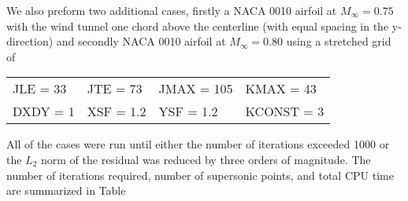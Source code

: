 We also preform two additional cases, firstly a NACA 0010 airfoil at $M_\infty = 0.75$ with the wind tunnel one chord above the centerline (with equal spacing in the y-direction) and secondly NACA 0010 airfoil at $M_\infty = 0.80$ using a stretched grid of

\begin{center}
    \begin{tabular}{@{} l l l l @{}}
        JLE = 33  & JTE = 73  & JMAX = 105  & KMAX = 43 \\
        DXDY = 1  & XSF = 1.2  & YSF = 1.2  & KCONST = 3
    \end{tabular}    
\end{center}

All of the cases were run until either the number of iterations exceeded 1000 or the $L_2$ norm of the residual was reduced by three orders of magnitude. The number of iterations required, number of supersonic points, and total CPU time are summarized in Table


